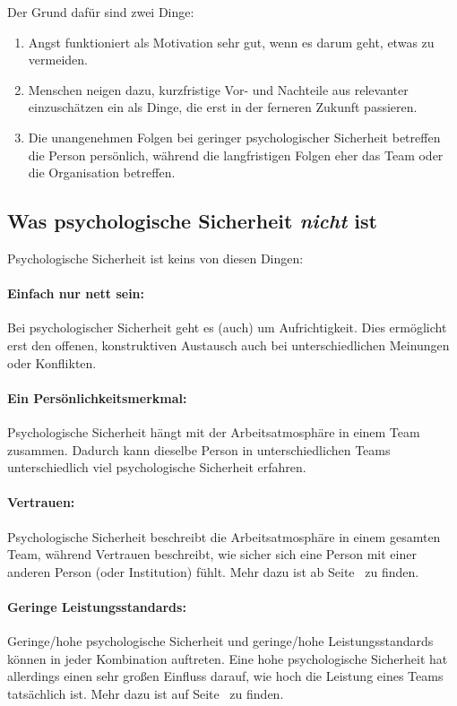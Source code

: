Der Grund dafür sind zwei Dinge:

\begin{enumerate}
    \item Angst funktioniert als Motivation sehr gut, wenn es darum geht, etwas zu vermeiden.
    \item Menschen neigen dazu, kurzfristige Vor- und Nachteile aus relevanter einzuschätzen ein als Dinge, die erst in der ferneren Zukunft passieren.
    \item Die unangenehmen Folgen bei geringer psychologischer Sicherheit betreffen die Person persönlich, während die langfristigen Folgen eher das Team oder die Organisation betreffen.
\end{enumerate}

\subsection{Was psychologische Sicherheit \emph{nicht} ist}

Psychologische Sicherheit ist keins von diesen Dingen:

\paragraph{Einfach nur nett sein:} Bei psychologischer Sicherheit geht es (auch) um Aufrichtigkeit. Dies ermöglicht erst den offenen, konstruktiven Austausch auch bei unterschiedlichen Meinungen oder Konflikten.

\paragraph{Ein Persönlichkeitsmerkmal:} Psychologische Sicherheit hängt mit der Arbeitsatmosphäre in einem Team zusammen. Dadurch kann dieselbe Person in unterschiedlichen Teams unterschiedlich viel psychologische Sicherheit erfahren.

\paragraph{Vertrauen:} Psychologische Sicherheit beschreibt die Arbeitsatmosphäre in einem gesamten Team, während Vertrauen beschreibt, wie sicher sich eine Person mit einer anderen Person (oder Institution) fühlt. Mehr dazu ist ab Seite~\pageref{vertrauen-vs-ps} zu finden.

\paragraph{Geringe Leistungsstandards:} Geringe/hohe psychologische Sicherheit und geringe/hohe Leistungsstandards können in jeder Kombination auftreten. Eine hohe psychologische Sicherheit hat allerdings einen sehr großen Einfluss darauf, wie hoch die Leistung eines Teams tatsächlich ist. Mehr dazu ist auf Seite~\pageref{ps-leistung} zu finden.

